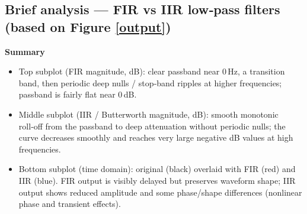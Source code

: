 \documentclass[11pt]{article}
\begin{document}
\subsection*{Brief analysis --- FIR vs IIR low‑pass filters (based on Figure \ref{output})}

\noindent\textbf{Summary}
\begin{itemize}
    \item Top subplot (FIR magnitude, dB): clear passband near 0\,Hz, a transition band, then periodic deep nulls / stop‑band ripples at higher frequencies; passband is fairly flat near 0\,dB.
    \item Middle subplot (IIR / Butterworth magnitude, dB): smooth monotonic roll‑off from the passband to deep attenuation without periodic nulls; the curve decreases smoothly and reaches very large negative dB values at high frequencies.
    \item Bottom subplot (time domain): original (black) overlaid with FIR (red) and IIR (blue). FIR output is visibly delayed but preserves waveform shape; IIR output shows reduced amplitude and some phase/shape differences (nonlinear phase and transient effects).
\end{itemize}
\end{document}
